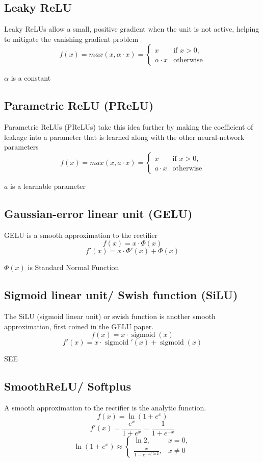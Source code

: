 \subsection{Leaky ReLU \cite{wiki-Rectifier}}\label{Leaky ReLU}
Leaky ReLUs allow a small, positive gradient when the unit is not active, helping to mitigate the vanishing gradient problem
\[
f(x)=max(x, \alpha\cdot x)={\begin{cases}x&{\text{if }}x>0,\\\alpha\cdot x&{\text{otherwise}}\end{cases}} 
\]

$\alpha$ is a constant

\subsection{Parametric ReLU (PReLU) \cite{wiki-Rectifier}}\label{Parametric ReLU (PReLU)}
Parametric ReLUs (PReLUs) take this idea further by making the coefficient of leakage into a parameter that is learned along with the other neural-network parameters
\[
f(x)=max(x, a\cdot x)={\begin{cases}x&{\text{if }}x>0,\\a\cdot x&{\text{otherwise}}\end{cases}}
\]

$a$ is a learnable parameter

\subsection{Gaussian-error linear unit (GELU)}\label{Gaussian-error linear unit (GELU)}
GELU is a smooth approximation to the rectifier
\[
    f(x)=x\cdot \Phi (x)
\]
\[
    f'(x)=x\cdot \Phi '(x)+\Phi (x)
\]

$\Phi (x)$ is Standard Normal Function


\subsection{Sigmoid linear unit/ Swish function (SiLU)}\label{Sigmoid linear unit/ Swish function (SiLU)}
The SiLU (sigmoid linear unit) or swish function is another smooth approximation, first coined in the GELU paper.
\[
    f(x)=x\cdot \operatorname {sigmoid} (x)
\]
\[
    f'(x)=x\cdot \operatorname {sigmoid} '(x)+\operatorname {sigmoid} (x)
\]

SEE 

\subsection{SmoothReLU/ Softplus \cite{wiki-Rectifier}}\label{SmoothReLU/ Softplus}
A smooth approximation to the rectifier is the analytic function.
\[ 
f(x)=\ln(1+e^{x}) 
\]
\[
f'(x)={\displaystyle\frac {e^{x}}{1+e^{x}}}={\displaystyle \frac {1}{1+e^{-x}}} 
\]
\[ 
    \ln \left(1+e^{x}\right)\approx {\begin{cases}\ln 2,&x=0,\\[6pt]{\displaystyle \frac {x}{1-e^{-x/\ln 2}}},&x\neq 0\end{cases}} 
\]

